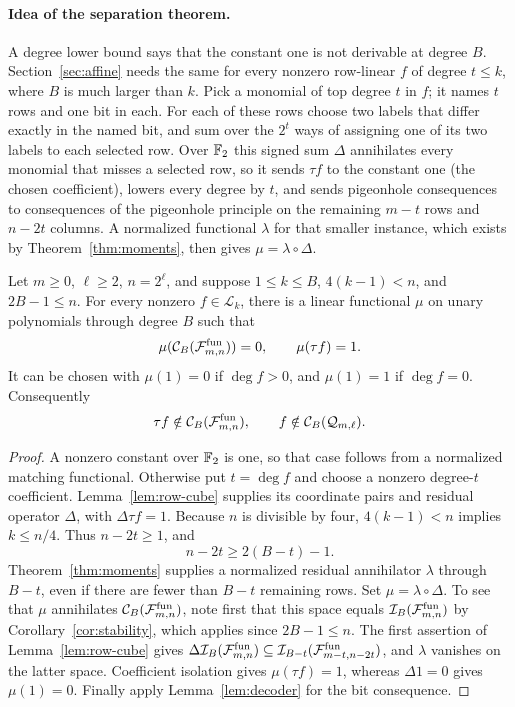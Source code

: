 \paragraph{Idea of the separation theorem.}
A degree lower bound says that the constant one is not derivable at degree
\(B\). Section~\ref{sec:affine} needs the same for every nonzero row-linear
\(f\) of degree \(t\le k\), where \(B\) is much larger than \(k\). Pick a
monomial of top degree \(t\) in \(f\); it names \(t\) rows and one bit in
each. For each of these rows choose two labels that differ exactly in the
named bit, and sum over the \(2^t\) ways of assigning one of its two labels
to each selected row. Over \(\mathbb F_2\) this signed sum \(\Delta\) annihilates
every monomial that misses a selected row, so it sends \(\tau f\) to the
constant one (the chosen coefficient), lowers every degree by \(t\), and
sends pigeonhole consequences to consequences of the pigeonhole principle
on the remaining \(m-t\) rows and \(n-2t\) columns. A normalized functional
\(\lambda\) for that smaller instance, which exists by
Theorem~\ref{thm:moments}, then gives \(\mu=\lambda\circ\Delta\).

\begin{theorem}
\label{thm:row-separation}
Let \(m\ge0\), \(\ell\ge2\), \(n=2^\ell\), and suppose
\(1\le k\le B\), \(4(k-1)<n\), and \(2B-1\le n\).
For every nonzero \(f\in\mathcal L_k\), there is a linear functional
\(\mu\) on unary polynomials through degree \(B\) such that
\[
 \mu(\mathcal C_B(\mathcal F^{\mathrm{fun}}_{m,n}))=0,
 \qquad \mu(\tau f)=1.
\]
It can be chosen with \(\mu(1)=0\) if \(\deg f>0\), and
\(\mu(1)=1\) if \(\deg f=0\). Consequently
\[
 \tau f\notin\mathcal C_B(\mathcal F^{\mathrm{fun}}_{m,n}),\qquad
 f\notin\mathcal C_B(\mathcal Q_{m,\ell}).
\]
\end{theorem}
\begin{proof}
A nonzero constant over \(\mathbb F_2\) is one, so that case follows from a
normalized matching functional. Otherwise put \(t=\deg f\) and choose a
nonzero degree-\(t\) coefficient. Lemma~\ref{lem:row-cube} supplies its
coordinate pairs and residual operator \(\Delta\), with \(\Delta\tau f=1\).
Because \(n\) is divisible by four, \(4(k-1)<n\) implies \(k\le n/4\).
Thus \(n-2t\ge1\), and
\[
 n-2t\ge2(B-t)-1.
\]
Theorem~\ref{thm:moments} supplies a normalized residual annihilator
\(\lambda\) through \(B-t\), even if there are fewer than \(B-t\)
remaining rows. Set \(\mu=\lambda\circ\Delta\).
To see that \(\mu\) annihilates \(\mathcal C_B(\mathcal F^{\mathrm{fun}}_{m,n})\),
note first that this space equals \(\mathcal I_B(\mathcal F^{\mathrm{fun}}_{m,n})\)
by Corollary~\ref{cor:stability}, which applies since \(2B-1\le n\).
The first assertion of Lemma~\ref{lem:row-cube} gives
\(\Delta\mathcal I_B(\mathcal F^{\mathrm{fun}}_{m,n})\subseteq
\mathcal I_{B-t}(\mathcal F^{\mathrm{fun}}_{m-t,n-2t})\), and \(\lambda\)
vanishes on the latter space. Coefficient isolation gives
\(\mu(\tau f)=1\), whereas \(\Delta1=0\) gives \(\mu(1)=0\).
Finally apply Lemma~\ref{lem:decoder} for the bit consequence.
\end{proof}
